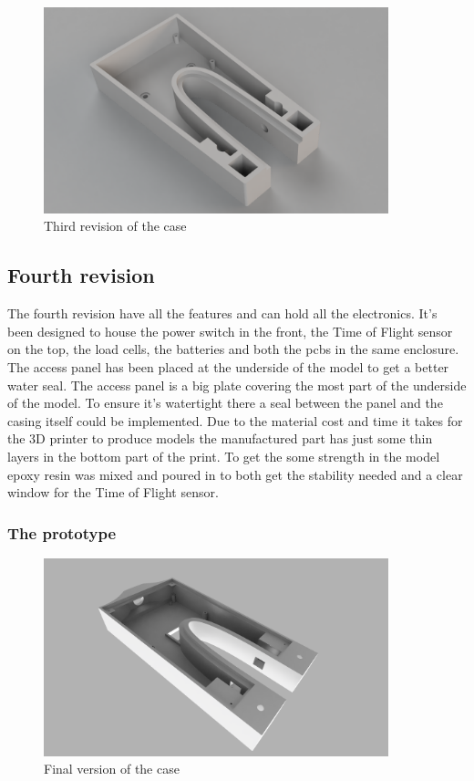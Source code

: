 
\begin{figure}[H]
\begin{center}
	\includegraphics[width = 10cm]{Figures/Case_rev_3.png}
	\caption{Third revision of the case}
	\label{Case_rev_2}
\end{center}
\end{figure}

\subsection{Fourth revision}

The fourth revision have all the features and can hold all the electronics. It's been designed to house the power switch in the front, the Time of Flight sensor on the top, the load cells, the batteries and both the \gls{pcb}s in the same enclosure. The access panel has been placed at the underside of the model to get a better water seal. The access panel is a big plate covering the most part of the underside of the model. To ensure it's watertight there a seal between the panel and the casing itself could be implemented.
Due to the material cost and time it takes for the 3D printer to produce models the manufactured part has just some thin layers in the bottom part of the print. To get the some strength in the model epoxy resin was mixed and poured in to both get the stability needed and a clear window for the Time of Flight sensor.

\subsubsection{The prototype}

\begin{figure}[H]
\begin{center}
	\includegraphics[width = 10cm]{Figures/Case_rev_4.png}
	\caption{Final version of the case}
	\label{Case_rev_4}
\end{center}
\end{figure}

